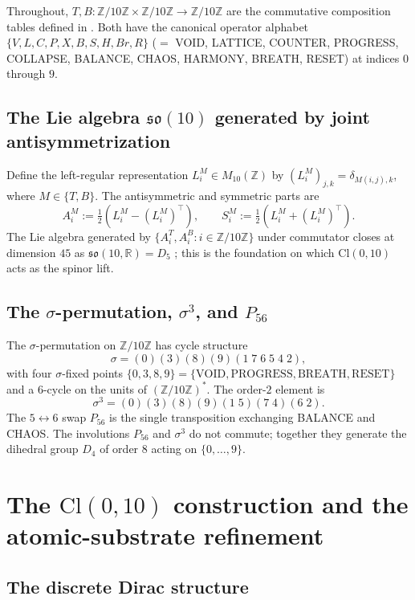 \documentclass[11pt,reqno]{amsart}
\theoremstyle{definition}
\newcommand{\Z}{\mathbb{Z}}
\newcommand{\R}{\mathbb{R}}
\newcommand{\so}{\mathfrak{so}}
\newcommand{\Cl}{\mathrm{Cl}}
\newcommand{\TSML}{T}
\newcommand{\BHML}{B}
\newcommand{\Psix}{P_{56}}
\begin{document}
Throughout, $\TSML, \BHML : \Z/10\Z \times \Z/10\Z \to \Z/10\Z$
are the commutative composition tables defined in
\cite{Sanders2026CLAxioms}. Both have the canonical operator
alphabet $\{V, L, C, P, X, B, S, H, Br, R\}$ ($=$ VOID, LATTICE,
COUNTER, PROGRESS, COLLAPSE, BALANCE, CHAOS, HARMONY, BREATH,
RESET) at indices $0$ through $9$.

\subsection{The Lie algebra $\so(10)$ generated by joint
antisymmetrization}
\label{ssec:so10-prereq}

Define the left-regular representation $L^M_i \in M_{10}(\Z)$
by $(L^M_i)_{j,k} = \delta_{M(i,j), k}$, where $M \in \{\TSML,
\BHML\}$. The antisymmetric and symmetric parts are
\[
  A^M_i := \tfrac{1}{2}(L^M_i - (L^M_i)^\top), \qquad
  S^M_i := \tfrac{1}{2}(L^M_i + (L^M_i)^\top).
\]
The Lie algebra generated by $\{A^\TSML_i, A^\BHML_i :
i \in \Z/10\Z\}$ under commutator closes at dimension $45$ as
$\so(10, \R) = D_5$ \cite{Sanders2026so10}; this is the foundation
on which $\Cl(0, 10)$ acts as the spinor lift.

\subsection{The $\sigma$-permutation, $\sigma^3$, and $\Psix$}
\label{ssec:permutations}

The $\sigma$-permutation on $\Z/10\Z$ has cycle structure
\[
  \sigma = (0)(3)(8)(9)(1\;7\;6\;5\;4\;2),
\]
with four $\sigma$-fixed points $\{0,3,8,9\} = \{\mathrm{VOID},
\mathrm{PROGRESS}, \mathrm{BREATH}, \mathrm{RESET}\}$ and a
$6$-cycle on the units of $(\Z/10\Z)^*$. The order-$2$ element is
\[
  \sigma^3 = (0)(3)(8)(9)(1\;5)(7\;4)(6\;2).
\]
The $5\!\leftrightarrow\!6$ swap $\Psix$ is the single
transposition exchanging BALANCE and CHAOS. The involutions $\Psix$
and $\sigma^3$ do not commute; together they generate the dihedral
group $D_4$ of order $8$ acting on $\{0, \ldots, 9\}$.

\section{The $\Cl(0, 10)$ construction and the atomic-substrate
refinement}
\label{sec:clifford}

\subsection{The discrete Dirac structure}
\label{ssec:gamma}
\end{document}
